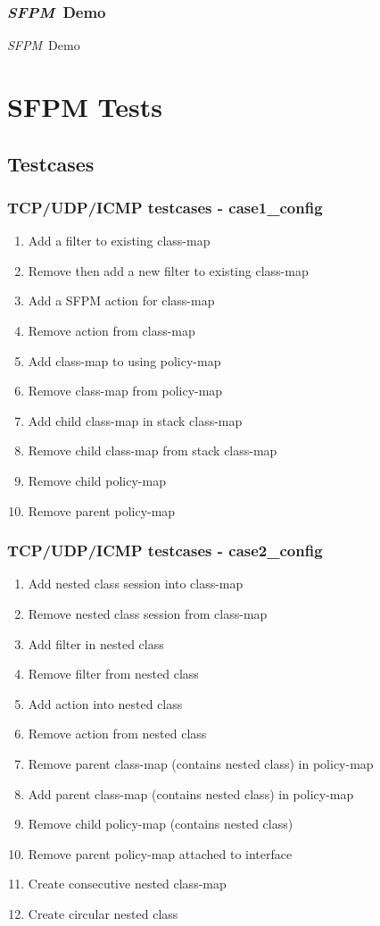 \documentclass{beamer}
\newcommand{\sfpm}{\emph{SFPM}}
\begin{document}
\begin{frame}[fragile] \frametitle{\sfpm~Demo}
\begin{center}
	 \huge{\sfpm~Demo}
\end{center}
\end{frame}

\section{SFPM Tests}
\subsection{Testcases}
\begin{frame}[fragile] \frametitle{TCP/UDP/ICMP testcases - case1\_config}
\begin{enumerate}
    \item Add a filter to existing class-map
    \item Remove then add a new filter to existing class-map
    \item Add a SFPM action for class-map
    \item Remove action from class-map
    \item Add class-map to using policy-map
    \item Remove class-map from policy-map
    \item Add child class-map in stack class-map
    \item Remove child class-map from stack class-map
    \item Remove child policy-map
    \item Remove parent policy-map
\end{enumerate}
\end{frame}

\begin{frame}[fragile] \frametitle{TCP/UDP/ICMP testcases - case2\_config}
\begin{enumerate}
    \item Add nested class session into class-map
    \item Remove nested class session from class-map
    \item Add filter in nested class
    \item Remove filter from nested class
    \item Add action into nested class
    \item Remove action from nested class
    \item Remove parent class-map (contains nested class) in policy-map
    \item Add parent class-map (contains nested class) in policy-map
    \item Remove child policy-map (contains nested class)
    \item Remove parent policy-map attached to interface
    \item Create consecutive nested class-map
    \item Create circular nested class
\end{enumerate}
\end{frame}
\end{document}
